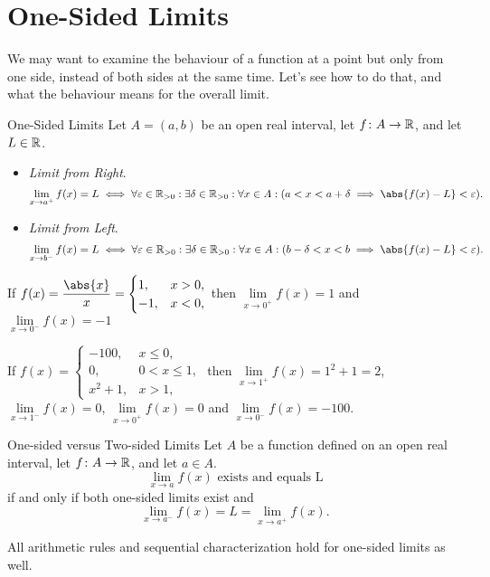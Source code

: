 \section{One-Sided Limits}
We may want to examine the behaviour of a function at a point but only
from one side, instead of both sides at the same time. Let's see how to
do that, and what the behaviour means for the overall limit.
\begin{Definition}{One-Sided Limits}{}
    Let $ A=(a,b) $ be an open real interval, let $ f\colon A\to \mathbb{R} $, and let $ L\in\mathbb{R} $.
    \begin{itemize}
        \item \emph{Limit from Right}.
              \[ \lim\limits_{{x} \to {a^+}}f(x)=L\iff
                  \forall \varepsilon\in\R_{>0}:\exists \delta\in\R_{>0}:\forall x\in A: (a<x<a+\delta\implies \abs{f(x)-L}<\varepsilon). \]
        \item \emph{Limit from Left}.
              \[ \lim\limits_{{x} \to {b^-}}f(x)=L\iff
                  \forall \varepsilon\in\R_{>0}:\exists \delta\in\R_{>0}:\forall x\in A: (b-\delta<x<b\implies \abs{f(x)-L}<\varepsilon). \]
    \end{itemize}
\end{Definition}
\begin{Example}{}{}
    If $ \displaystyle  f(x)=\frac{\abs{x}}{x}=\begin{cases}
            1,  & x>0, \\
            -1, & x<0,
        \end{cases} $ then $\lim\limits_{{x} \to {0^+}}f(x)=1$ and $\lim\limits_{{x} \to {0^-}}f(x)=-1$
\end{Example}
\begin{Example}{}{}
    If $ \displaystyle  f(x)=\begin{cases}
            -100,  & x\le 0,   \\
            0,     & 0<x\le 1, \\
            x^2+1, & x>1,
        \end{cases} $ then $ \lim\limits_{{x} \to {1^+}}f(x)=1^2+1=2 $, $ \lim\limits_{{x} \to {1^-}}f(x)=0 $,
    $ \lim\limits_{{x} \to {0^+}}f(x)=0 $ and $ \lim\limits_{{x} \to {0^-}}f(x)=-100 $.
\end{Example}
\begin{Theorem}{One-sided versus Two-sided Limits}{}
    Let $ A $ be a function defined on an open real interval, let $ f\colon A\to \mathbb{R} $, and let
    $ a\in A $.
    \[ \text{$\lim\limits_{{x} \to {a}}f(x)$ exists and equals L} \]
    if and only if both one-sided limits exist and
    \[ \lim\limits_{{x} \to {a^-}}f(x) =L=\lim\limits_{{x} \to {a^+}}f(x). \]
\end{Theorem}
\begin{Remark}{}{}
    All arithmetic rules and sequential characterization hold for one-sided limits as well.
\end{Remark}
